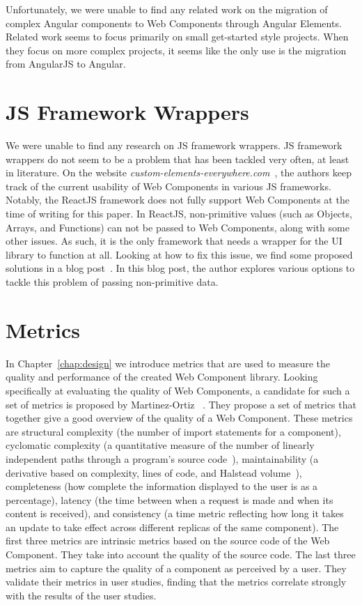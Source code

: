 Unfortunately, we were unable to find any related work on the migration of complex Angular components to Web Components through Angular Elements. Related work seems to focus primarily on small get-started style projects. When they focus on more complex projects, it seems like the only use is the migration from AngularJS to Angular.

\section{JS Framework Wrappers}
We were unable to find any research on JS framework wrappers. JS framework wrappers do not seem to be a problem that has been tackled very often, at least in literature. On the website \emph{custom-elements-everywhere.com}~, the authors keep track of the current usability of Web Components in various JS frameworks. Notably, the ReactJS framework does not fully support Web Components at the time of writing for this paper. In ReactJS, non-primitive values (such as Objects, Arrays, and Functions) can not be passed to Web Components, along with some other issues. As such, it is the only framework that needs a wrapper for the UI library to function at all. Looking at how to fix this issue, we find some proposed solutions in a blog post~. In this blog post, the author explores various options to tackle this problem of passing non-primitive data.

\section{Metrics}\label{sec:related-work:metrics}
In Chapter~\ref{chap:design} we introduce metrics that are used to measure the quality and performance of the created Web Component library. Looking specifically at evaluating the quality of Web Components, a candidate for such a set of metrics is proposed by Martinez-Ortiz \etal{}~\cite{martinez-ortiz2016quality}. They propose a set of metrics that together give a good overview of the quality of a Web Component. These metrics are structural complexity (the number of import statements for a component), cyclomatic complexity (a quantitative measure of the number of linearly independent paths through a program's source code~\cite{1702388}), maintainability (a derivative based on complexity, lines of code, and Halstead volume~\cite{halstead1977elements}), completeness (how complete the information displayed to the user is as a percentage), latency (the time between when a request is made and when its content is received), and consistency (a time metric reflecting how long it takes an update to take effect across different replicas of the same component). The first three metrics are intrinsic metrics based on the source code of the Web Component. They take into account the quality of the source code. The last three metrics aim to capture the quality of a component as perceived by a user. They validate their metrics in user studies, finding that the metrics correlate strongly with the results of the user studies.

